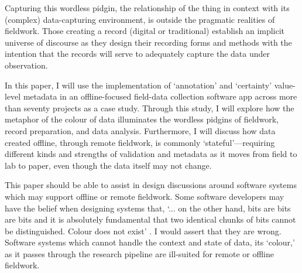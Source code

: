 \documentclass{scrarticle}
\begin{document}
Capturing this wordless pidgin, the relationship of the thing in context with its (complex) data-capturing environment, is outside the pragmatic realities of fieldwork. Those creating a record (digital or traditional) establish an implicit universe of discourse as they design their recording forms and methods with the intention that the records will serve to adequately capture the data under observation. 

In this paper, I will use the implementation of `annotation' and `certainty' value-level metadata in an offline-focused field-data collection software app across more than seventy projects as a case study. Through this study, I will explore how the metaphor of the colour of data illuminates the wordless pidgins of fieldwork, record preparation, and data analysis. Furthermore, I will discuss how data created offline, through remote fieldwork, is commonly `stateful'---requiring different kinds and strengths of validation and metadata as it moves from field to lab to paper, even though the data itself may not change. 

This paper should be able to assist in design discussions around software systems which may support offline or remote fieldwork. Some software developers may have the belief when designing systems that, `... on the other hand, bits are bits are bits and it is absolutely fundamental that two identical chunks of bits cannot be distinguished.  Colour does not exist' \parencite{Skala2004-zc}. I would assert that they are wrong. Software systems which cannot handle the context and state of data, its `colour,' as it passes through the research pipeline are ill-suited for remote or offline fieldwork.




\printbibliography
\end{document}
